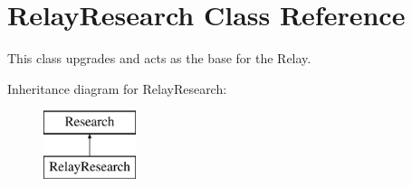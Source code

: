 \hypertarget{class_relay_research}{}\section{Relay\+Research Class Reference}
\label{class_relay_research}


This class upgrades and acts as the base for the Relay.  


Inheritance diagram for Relay\+Research\+:\begin{figure}[H]
\begin{center}
\leavevmode
\includegraphics[height=2.000000cm]{class_relay_research}
\end{center}
\end{figure}
